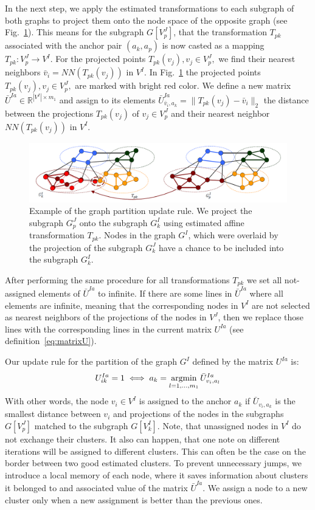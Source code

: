 In the next step, we apply the estimated transformations to each subgraph of both graphs to project them onto the node space of the opposite graph (see Fig.~\ref{fig:update}). This means for the subgraph $G[V^J_p]$, that the transformation $T_{pk}$ associated with the anchor pair $(a_k,a_p)$ is now casted as a mapping $T_{pk}:V^J_p\rightarrow V^I$. For the projected points $T_{pk}(v_j),v_j\in V^J_p,$ we find their nearest neighbors $\bar{v}_i=NN(T_{pk}(v_j))$ in $V^I$. In Fig.~\ref{fig:update} the projected points $T_{pk}(v_j),v_j\in V^J_p,$ are marked with bright red color. We define a new matrix $\bar{U}^{Ia}\in\mathbb{R}^{|V^I|\times m_1}$ and assign to its elements $\bar{U}^{Ia}_{\bar{v}_i,a_k}=\|T_{pk}(v_j)-\bar{v}_i\|_2$ the distance between the projections $T_{pk}(v_j)$ of $v_j\in V^J_p$ and their nearest neighbor $NN(T_{pk}(v_j))$ in $V^I$.

\begin{figure}[h]
	\centering
	\includegraphics[scale=0.35]{chapter2/fig/update.png}
	\caption[Example of the graph partition update rule]{Example of the graph partition update rule. We project the subgraph $G^J_p$ onto the subgraph $G^I_k$ using estimated affine transformation $T_{pk}$. Nodes in the graph $G^I$, which were overlaid by the projection of the subgraph $G^J_k$ have a chance to be included into the subgraph $G^I_k$.} \label{fig:update}
\end{figure}

After performing the same procedure for all transformations $T_{pk}$ we set all not-assigned elements of $\bar{U}^{Ia}$ to infinite. If there are some lines in $\bar{U}^{Ia}$ where all elements are infinite, meaning that the corresponding nodes in $V^I$ are not selected as nearest neighbors of the projections of the nodes in $V^J$,
then we replace those lines with the corresponding lines in the current matrix $U^{Ia}$ (see definition~\eqref{eq:matrixU}).

Our update rule for the partition of the graph $G^I$ defined by the matrix $U^{Ia}$ is:
\begin{equation}
U^{Ia}_{ik}=1 \iff a_k=\mathop{\rm argmin}_{l=1,\dots,m_1}^{}{\bar{U}^{Ia}_{v_i,a_l}}
\end{equation}
With other words, the node $v_i\in V^I$ is assigned to the anchor $a_k$ if $\bar{U}_{v_i,a_k}$ is the smallest distance between $v_i$ and projections of the nodes in the subgraphs $G[V^J_p]$ matched to the subgraph $G[V^I_k]$. Note, that unassigned nodes in $V^I$ do not exchange their clusters. It also can happen, that one note on different iterations will be assigned to different clusters. This can often be the case on the border between two good estimated clusters. To prevent unnecessary jumps, we introduce a local memory of each node, where it saves information about clusters it belonged to and associated value of the matrix $\bar{U}^{Ia}$. We assign a node to a new cluster only when a new assignment is better than the previous ones.

